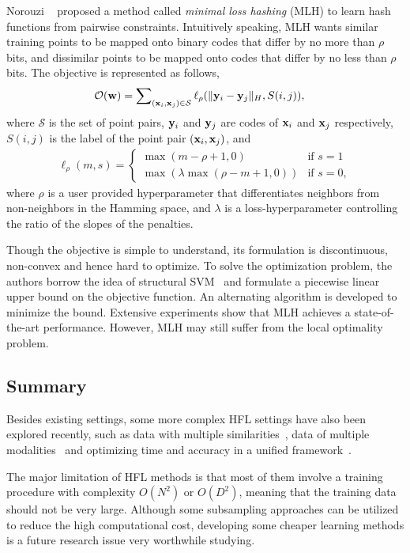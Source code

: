 Norouzi \etal~\cite{norouzi2011icml} proposed a method called \textit{minimal loss hashing} (\mbox{MLH}) to learn hash functions from pairwise constraints. Intuitively speaking, \mbox{MLH} wants similar training points to be mapped onto binary codes that differ by no more than $ \rho $ bits, and dissimilar points to be mapped onto codes that differ by no less than $ \rho $ bits. The objective is represented as follows,
\begin{align}
\mathcal{O}({\bf w})  &=\sum\nolimits_{({\bf x}_{i},{\bf x}_{j})\in\mathcal{S}}\ell_\rho(\|{\bf y}_i-{\bf y}_j\|_{H},S(i,j)),\nonumber
\end{align}
where $ \mathcal{S} $ is the set of point pairs, $ {\bf y}_i $ and $ {\bf y}_j $ are codes of $ {\bf x}_i $ and $ {\bf x}_j $ respectively, $ S(i,j) $ is the label of the point pair $ ({\bf x}_i, {\bf x}_j) $, and 
\begin{align}
\ell_{\rho}(m,s) = \left\{ \begin{array}{ll}
\max(m-\rho+1,0) & \mbox{if } s = 1\\
\max(\lambda\max(\rho-m+1,0)) & \mbox{if } s=0,
\end{array} \right.\nonumber
\end{align}
where $ \rho $ is a user provided hyperparameter that differentiates neighbors from non-neighbors in the Hamming space, and $ \lambda $ is a loss-hyperparameter controlling the ratio of the slopes of the penalties.

Though the objective is simple to understand, its formulation is discontinuous, non-convex and hence hard to optimize. To solve the optimization problem, the authors borrow the idea of structural \mbox{SVM}~\cite{tsochantaridis2004icml} and formulate a piecewise linear upper bound on the objective function. An alternating algorithm is developed to minimize the bound. Extensive experiments show that \mbox{MLH} achieves a state-of-the-art performance. However, \mbox{MLH} may still suffer from the local optimality problem.

\subsection{Summary}


Besides existing settings, some more complex \mbox{HFL} settings have also been explored recently, such as data with multiple similarities~\cite{zhang2011sigir}, data of multiple modalities~\cite{bronstein2010cvpr} and optimizing time and accuracy in a unified framework~\cite{he2011cvpr}.

The major limitation of \mbox{HFL} methods is that most of them involve a training procedure with complexity $ O(N^2) $ or $ O(D^2) $, meaning that the training data should not be very large. Although some subsampling approaches can be utilized to reduce the high computational cost, developing some cheaper learning methods is a future research issue very worthwhile studying.

